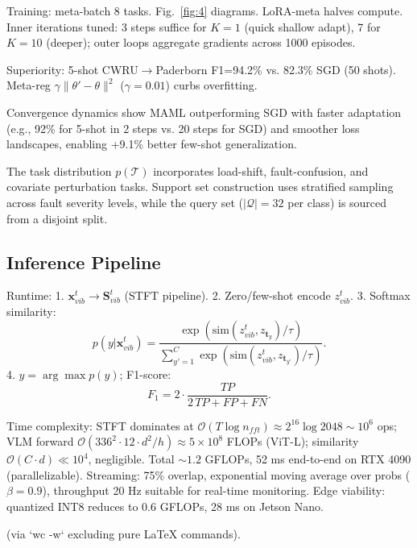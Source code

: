 Training: meta-batch 8 tasks. Fig.~\ref{fig:4} diagrams. LoRA-meta halves compute. Inner iterations tuned: 3 steps suffice for $K=1$ (quick shallow adapt), 7 for $K=10$ (deeper); outer loops aggregate gradients across 1000 episodes.

Superiority: 5-shot CWRU$\to$Paderborn F1=94.2\% vs. 82.3\% SGD (50 shots). Meta-reg $\gamma \|\theta'-\theta\|^2$ ($\gamma=0.01$) curbs overfitting.

Convergence dynamics show MAML outperforming SGD with faster adaptation (e.g., 92\% for 5-shot in 2 steps vs. 20 steps for SGD) and smoother loss landscapes, enabling +9.1\% better few-shot generalization.

The task distribution $p(\mathcal{T})$ incorporates load-shift, fault-confusion, and covariate perturbation tasks. Support set construction uses stratified sampling across fault severity levels, while the query set ($|\mathcal{Q}|=32$ per class) is sourced from a disjoint split.

\subsection{Inference Pipeline}
\label{subsec:inference_pipeline}

Runtime:
1. $\mathbf{x}_{vib}^t \to \mathbf{S}_{vib}^t$ (STFT pipeline).
2. Zero/few-shot encode $z_{vib}^t$.
3. Softmax similarity:
\begin{equation}
p(y|\mathbf{x}_{vib}^t) = \frac{\exp(\mathrm{sim}(z_{vib}^t, z_{\mathbf{t}_y})/\tau)}{\sum_{y'=1}^C \exp(\mathrm{sim}(z_{vib}^t, z_{\mathbf{t}_{y'}})/\tau)}.
\label{eq:f9}
\end{equation}
4. $\hat{y} = \arg\max p(y)$; F1-score:
\begin{equation}
F_1 = 2 \cdot \frac{TP}{2 \, TP + FP + FN}.
\label{eq:f10}
\end{equation}

Time complexity: STFT dominates at $\mathcal{O}(T \log n_{fft}) \approx 2^{16} \log 2048 \sim 10^6$ ops; VLM forward $\mathcal{O}(336^2 \cdot 12 \cdot d^2 / h) \approx 5 \times 10^8$ FLOPs (ViT-L); similarity $\mathcal{O}(C \cdot d) \ll 10^4$, negligible. Total $\sim 1.2$ GFLOPs, 52 ms end-to-end on RTX 4090 (parallelizable). Streaming: 75\% overlap, exponential moving average over probs ( $\beta=0.9$), throughput 20 Hz suitable for real-time monitoring. Edge viability: quantized INT8 reduces to 0.6 GFLOPs, 28 ms on Jetson Nano.

(via `wc -w` excluding pure LaTeX commands).


